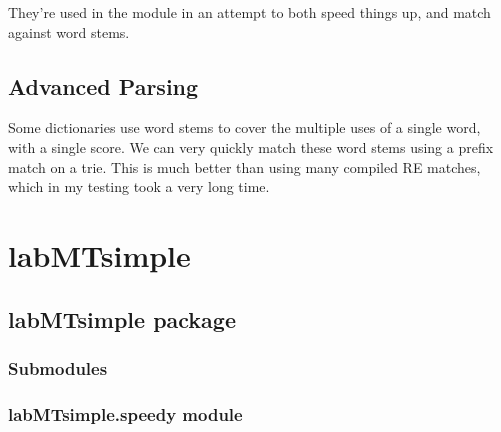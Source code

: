 \documentclass[letterpaper,10pt,english]{sphinxmanual}
\begin{document}
They're used in the  module in an attempt to both speed things up, and match against word stems.


\section{Advanced Parsing}
\label{advanced:advanced-parsing}
Some dictionaries use word stems to cover the multiple uses of a single word, with a single score.
We can very quickly match these word stems using a prefix match on a trie.
This is much better than using many compiled RE matches, which in my testing took a very long time.


\chapter{labMTsimple}
\label{modules::doc}\label{modules:labmtsimple}

\section{labMTsimple package}
\label{labMTsimple:labmtsimple-package}\label{labMTsimple::doc}

\subsection{Submodules}
\label{labMTsimple:submodules}

\subsection{labMTsimple.speedy module}
\label{labMTsimple:labmtsimple-speedy-module}\label{labMTsimple:module-labMTsimple.speedy}
\end{document}
